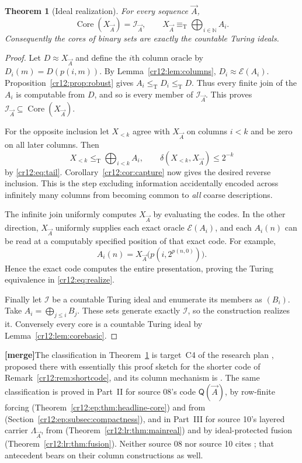 \documentclass[11pt,letterpaper]{article}
\theoremstyle{plain}
\newtheorem{theorem}{Theorem}[section]
\theoremstyle{definition}
\theoremstyle{remark}
\numberwithin{equation}{section}
\newcommand{\N}{\mathbb N}
\newcommand{\leT}{\leq_{\mathrm T}}
\newcommand{\eqT}{\equiv_{\mathrm T}}
\newcommand{\Core}{\operatorname{Core}}
\newcommand{\Ecode}{\mathcal E}
\newcommand{\I}{\mathcal I}
\newcommand{\joinvec}{\bigoplus_{i\in\N}}
\newcommand{\mergenote}[1]{\par\smallskip\noindent
 {\small\textsf{\textbf{[merge]}}\enspace #1}\par\smallskip}
\newcommand{\QQ}{\mathsf Q}              %
\newcommand{\Lam}{\Lambda_{\vec A}}      %
\begin{document}
\begin{theorem}[Ideal realization]\label{cr12:thm:realize}
For every sequence $\vec A$,
\begin{equation}\label{cr12:eq:realize}
 \Core(X_{\vec A})=\I_{\vec A},
 \qquad X_{\vec A}\eqT\joinvec A_i.
\end{equation}
Consequently the cores of binary sets are exactly the countable Turing ideals.
\end{theorem}
\begin{proof}
Let $D\approx X_{\vec A}$ and define the $i$th column oracle by
$D_i(m)=D(p(i,m))$. By Lemma~\ref{cr12:lem:columns},
$D_i\approx\Ecode(A_i)$. Proposition~\ref{cr12:prop:robust} gives $A_i\leT D_i\leT D$.
Thus every finite join of the $A_i$ is computable from $D$, and so is every
member of $\I_{\vec A}$. This proves
$\I_{\vec A}\subseteq\Core(X_{\vec A})$.

For the opposite inclusion let $X_{<k}$ agree with $X_{\vec A}$ on columns
$i<k$ and be zero on all later columns. Then
\[
 X_{<k}\leT\bigoplus_{i<k}A_i,
 \qquad
 \delta(X_{<k},X_{\vec A})\le2^{-k}
\]
by \eqref{cr12:eq:tail}. Corollary~\ref{cr12:cor:capture} now gives the desired reverse
inclusion. This is the step excluding information accidentally encoded across
infinitely many columns from becoming common to \emph{all} coarse descriptions.

The infinite join uniformly computes $X_{\vec A}$ by evaluating the codes.
In the other direction, $X_{\vec A}$ uniformly supplies each exact oracle
$\Ecode(A_i)$, and each $A_i(n)$ can be read at a computably specified position
of that exact code. For example,
\[
 A_i(n)=X_{\vec A}\bigl(p(i,2^{p(n,0)})\bigr).
\]
Hence the exact code computes the entire presentation, proving the Turing
 equivalence in \eqref{cr12:eq:realize}.

Finally let $\I$ be a countable Turing ideal and enumerate its members as
$(B_i)$. Take $A_i=\bigoplus_{j\le i}B_j$. These sets generate exactly $\I$,
so the construction realizes it. Conversely every core is a countable Turing
ideal by Lemma~\ref{cr12:lem:corebasic}.
\end{proof}
\mergenote{The classification in Theorem~\ref{cr12:thm:realize} is target~C4 of the
research plan \cite{Plan}, proposed there with essentially this proof sketch for the
shorter code of Remark~\ref{cr12:rem:shortcode}, and its column mechanism is
\cite[Lemma~3.10 and Theorem~3.11]{HJS}. The same classification is proved in
Part~II for source 08's code $\QQ(\vec A)$, by row-finite forcing
(Theorem~\ref{cr12:ep:thm:headline-core}) and from \cite[Theorem~3.7]{HJKS}
(Section~\ref{cr12:ep:subsec:compactness}), and in Part~III for source 10's layered
carrier $\Lam$, from \cite[Theorem~3.7]{HJKS} (Theorem~\ref{cr12:lr:thm:mainreal}) and
by ideal-protected fusion (Theorem~\ref{cr12:lr:thm:fusion}). Neither source 08 nor
source 10 cites \cite{HJS}; that antecedent bears on their column constructions as
well.}
\end{document}
